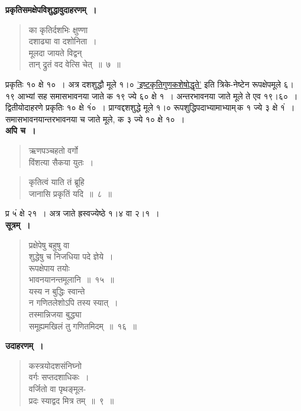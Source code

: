 \documentclass[11pt, openany]{book}
\begin{document}
\textbf{प्रकृतिसमक्षेपविशुद्धावुदाहरणम्~। }

\begin{quote}
{\ex का कृतिर्दशभिः क्षुण्णा\\
दशाढ्या वा दशोनिता~।\\
मूलदा जायते विद्वन्\\
तान् द्रुतं वद वेत्सि चेत्~॥~७~॥~	}
\end{quote}

प्रकृतिः १० क्षे १०~। अत्र दशशुद्धौ मूले १।० \hyperref[10.4]{'इष्टकृतिगुणकशेषोद्धृते'} इति त्रिके-नेष्टेन रूपक्षेपमूले ६।१९ आभ्यां सह समासभावनया जाते क १९ ज्ये ६० क्षे १~। अन्तरभावनया जाते मूले ते एव १९।६०~। द्वितीयोदाहरणे प्रकृतिः १० क्षे १ं०~। प्राग्वद्दशशुद्धे मूले १।० रूपशुद्धिपदाभ्यामाभ्याम्\textendash \,क १ ज्ये ३ क्षे १ं~। समासभावनयान्तरभावनया च जाते मूले, क ३ ज्ये १० क्षे १०~। \\

\textbf{अपि च~। }

\begin{quote}
{\ex ऋणपञ्चहतो वर्गो\\
	विंशत्या सैकया युतः~।}	
\end{quote}

\newpage

\begin{quote}
{\ex कृतित्वं याति तं ब्रूहि\\
जानासि प्रकृतिं यदि~॥~८~॥~}	
\end{quote}

प्र ५ं क्षे २१~। अत्र जाते ह्रस्वज्येष्ठे १।४ वा २।१~। \\

\textbf{सूत्रम्~।} 

\begin{quote}
{\gk प्रक्षेपेषु बहुषु वा\\
शुद्धेषु च निजधिया पदे ज्ञेये~।\\
रूपक्षेपाय तयोः\\
भावनयानन्तमूलानि~॥~१५~॥\\
यस्य न बुद्धिः स्वान्ते\\
न गणितलेशोऽपि तस्य स्यात्~।\\
तस्मान्निजया बुद्ध्या\\
समूह्यमखिलं तु गणितमिदम्~॥~१६~॥}
\end{quote}

\textbf{उदाहरणम्~।} 

\begin{quote}
{\ex कस्त्रयोदशसंनिघ्नो\\
वर्गः सप्तदशाधिकः~।\\
वर्जितो वा पृथङ्मूल-\\
प्रदः स्याद्वद मित्र तम्~॥~९~॥	}
\end{quote}
\end{document}
